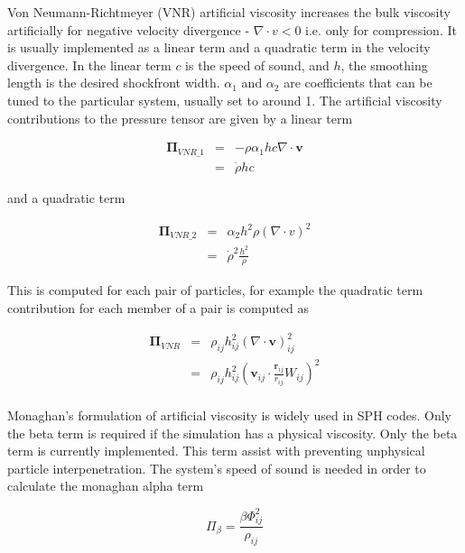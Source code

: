 Von Neumann-Richtmeyer (VNR) artificial viscosity increases the bulk viscosity
artificially for negative velocity divergence - $ \nabla \cdot v < 0 $ i.e.
only for compression.  It is usually implemented as a linear term and a
quadratic term in the velocity divergence. In the linear term $c$ is the speed
of sound, and $h$, the smoothing length is the desired shockfront width.
$\alpha_{1}$ and $\alpha_{2}$ are coefficients that can be tuned to the
particular system, usually set to around 1. The artificial viscosity
contributions to the pressure tensor are given by a linear term

\begin{eqnarray}
\label{linear_vnr_avsic}
\mathbold{\Pi}_{VNR\_1} &=& -\rho \alpha_{1} hc \nabla \cdot \mathbold{v} \\
&=& \dot{\rho} hc
\end{eqnarray}

and a quadratic term

\begin{eqnarray}
\label{quad_vnr_avisc}
\mathbold{\Pi}_{VNR\_2} &=& \alpha_{2} h^{2} \rho (\nabla \cdot v)^2 \\
&=& \dot{\rho}^{2} \frac{h^{2}}{\rho}
\end{eqnarray}

This is computed for each pair of particles, for example the quadratic term
contribution for each member of a pair is computed as

\begin{eqnarray}
\mathbold{\Pi}_{VNR} &=& \rho_{ij} h_{ij}^{2} 
\left( \nabla \cdot \mathbold{v} \right)_{ij}^{2} \\
&=& \rho_{ij} h_{ij}^{2} \left( \mathbold{v}_{ij} 
\cdot \frac{\mathbold{r}_{ij}}{r_{ij}} W_{ij} \right)^{2}
\end{eqnarray}

\paragraph{}
Monaghan's formulation of artificial viscosity is widely used in SPH codes.
Only the beta term is required if the simulation has a physical
viscosity.\cite{liu_smoothed_2003} Only the beta term is currently implemented.
This term assist with preventing unphysical particle interpenetration. The
system's speed of sound is needed in order to calculate the monaghan alpha term

\begin{equation}
\label{monag_beta_avisc}
\Pi_{\beta} = \frac{ \beta \Phi_{ij}^{2}}{\rho_{ij}}
\end{equation}

